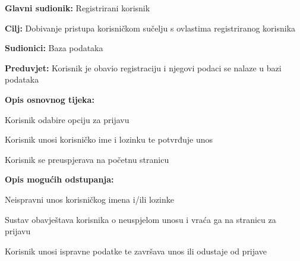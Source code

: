 \noindent {}
\begin{packed_item}

	\item \textbf{Glavni sudionik: }Registrirani korisnik
	\item  \textbf{Cilj:} Dobivanje pristupa korisničkom sučelju s ovlastima registriranog korisnika
	\item  \textbf{Sudionici:} Baza podataka
	\item  \textbf{Preduvjet:} Korisnik je obavio registraciju i njegovi podaci se nalaze u bazi podataka
	\item  \textbf{Opis osnovnog tijeka:}

	\item[] \begin{packed_enum}

		\item Korisnik odabire opciju za prijavu
		\item Korisnik unosi korisničko ime i lozinku te potvrđuje unos
		\item Korisnik se preuspjerava na početnu stranicu
	\end{packed_enum}

	\item  \textbf{Opis mogućih odstupanja:}

	\item[] \begin{packed_item}

		\item[2.a] Neispravni unos korisničkog imena i/ili lozinke
		\item[] \begin{packed_enum}

			\item Sustav obavještava korisnika o neuspjelom unosu i vraća ga na stranicu za prijavu
			\item Korisnik unosi ispravne podatke te završava unos ili odustaje od prijave

		\end{packed_enum}
	\end{packed_item}
\end{packed_item}

